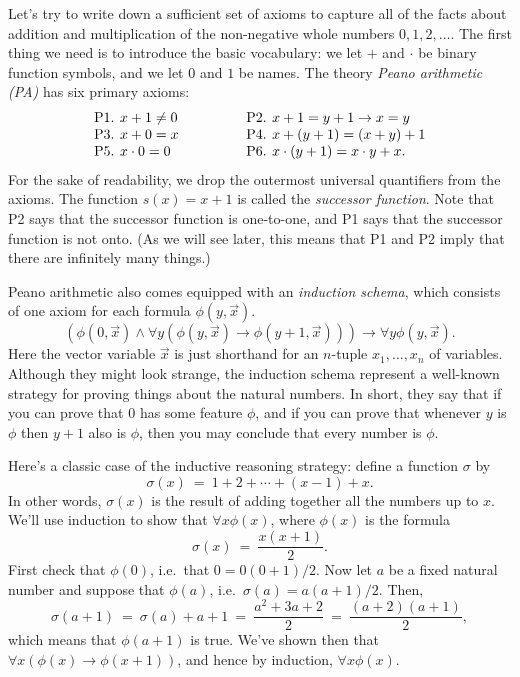 Let's try to write down a sufficient set of axioms to capture all of
the facts about addition and multiplication of the non-negative whole
numbers $0,1,2,\dots $.  The first thing we need is to introduce the
basic vocabulary: we let $+$ and $\cdot$ be binary function symbols,
and we let $0$ and $1$ be names.  The theory \emph{Peano arithmetic
  (PA)} has six primary axioms:
\[ \begin{array}{p{0.3cm} l p{1cm} p{0.3cm} l}
     P1. & x+1\neq 0 & & P2. & x+1=y+1\to x=y \\
     P3. & x+0=x     & & P4. & x+(y+1)=(x+y)+1 \\
     P5. & x\cdot 0=0 & & P6. & x\cdot (y+1)=x\cdot y+x
                                . \end{array} \] For the sake of
readability, we drop the outermost universal quantifiers from the axioms.  The function $s(x)=x+1$ is called the \emph{successor function}.  Note that P2 says that the successor function is one-to-one, and P1 says that the successor function is not onto.  (As we will see later, this means that P1 and P2 imply that there are infinitely many things.)


Peano arithmetic also comes equipped with an \emph{induction schema},
which consists of one axiom for each formula $\phi (y,\vec{x})$.
\[ (\phi (0,\vec{x})\wedge \forall y(\phi (y,\vec{x})\to \phi
  (y+1,\vec{x})))\to \forall y\phi (y,\vec{x}) .\] Here the vector
variable $\vec{x}$ is just shorthand for an $n$-tuple $x_1,\dots ,x_n$
of variables.  Although they might look strange, the induction schema
represent a well-known strategy for proving things about the natural
numbers.  In short, they say that if you can prove that $0$ has some
feature $\phi$, and if you can prove that whenever $y$ is $\phi$ then
$y+1$ also is $\phi$, then you may conclude that every number is
$\phi$.

Here's a classic case of the inductive reasoning strategy: define a
function $\sigma$ by 
\[ \sigma (x) \: = \: 1+2+\cdots +(x-1) + x. \] In other words,
$\sigma (x)$ is the result of adding together all the numbers up to
$x$.  We'll use induction to show that $\forall x\phi (x)$, where
$\phi (x)$ is the formula 
\[ \sigma (x)\:=\:\frac{x(x+1)}{2} .\] First check that $\phi (0)$,
i.e.\ that $0=0(0+1)/2$.  Now let $a$ be a fixed natural number and
suppose that $\phi (a)$, i.e.\ $\sigma (a)=a(a+1)/2$.  Then,
\[ \sigma (a+1) \:=\: \sigma (a)+a+1 \:=\:
  \frac{a^2+3a+2}{2}  \: = \: \frac{(a+2)(a+1)}{2} ,\]
which means that $\phi (a+1)$ is true.  We've shown then that $\forall
x(\phi (x)\to \phi (x+1))$, and hence by induction, $\forall x\phi
(x)$.

